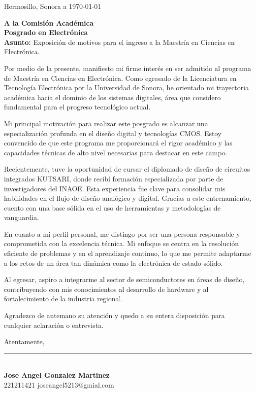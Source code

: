 \documentclass[12pt, a4paper]{article}
\begin{document}
\begin{flushright}
    Hermosillo, Sonora a \today %
\end{flushright}

\textbf{A la Comisión Académica}\\
\textbf{Posgrado en Electrónica}\\
\textbf{Asunto:} Exposición de motivos para el ingreso a la Maestría en Ciencias en Electrónica.


Por medio de la presente, manifiesto mi firme interés en ser admitido al programa de Maestría en Ciencias en Electrónica. Como egresado de la Licenciatura en Tecnología Electrónica por la Universidad de Sonora, he orientado mi trayectoria académica hacia el dominio de los sistemas digitales, área que considero fundamental para el progreso tecnológico actual.

Mi principal motivación para realizar este posgrado es alcanzar una especialización profunda en el diseño digital y tecnologías CMOS. Estoy convencido de que este programa me proporcionará el rigor académico y las capacidades técnicas de alto nivel necesarias para destacar en este campo.

Recientemente, tuve la oportunidad de cursar el diplomado de diseño de circuitos integrados KUTSARI, donde recibí formación especializada por parte de investigadores del INAOE. Esta experiencia fue clave para consolidar mis habilidades en el flujo de diseño analógico y digital. Gracias a este entrenamiento, cuento con una base sólida en el uso de herramientas y metodologías de vanguardia.

En cuanto a mi perfil personal, me distingo por ser una persona responsable y comprometida con la excelencia técnica. Mi enfoque se centra en la resolución eficiente de problemas y en el aprendizaje continuo, lo que me permite adaptarme a los retos de un área tan dinámica como la electrónica de estado sólido.

Al egresar, aspiro a integrarme al sector de semiconductores en áreas de diseño, contribuyendo con mis conocimientos al desarrollo de hardware y al fortalecimiento de la industria regional.

Agradezco de antemano su atención y quedo a su entera disposición para cualquier aclaración o entrevista.


\begin{center}
    Atentamente,
    
    \rule{5cm}{0.4pt} \\
    \textbf{Jose Angel Gonzalez Martinez} \\
    221211421 joseangel5213@gmial.com
\end{center}
\end{document}
